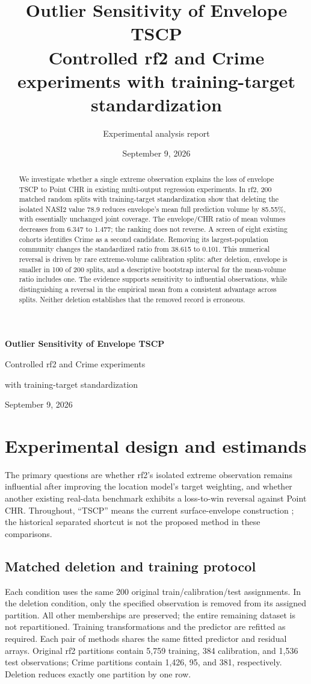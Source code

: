 \documentclass[11pt,letterpaper]{article}
\title{Outlier Sensitivity of Envelope TSCP\\[3pt]
\large Controlled rf2 and Crime experiments with training-target standardization}
\author{Experimental analysis report}
\date{September 9, 2026}
\begin{document}
\begin{center}
{\LARGE\bfseries Outlier Sensitivity of Envelope TSCP\par}
\vspace{0.4em}
{\large Controlled rf2 and Crime experiments\par}
{\large with training-target standardization\par}
\vspace{0.6em}
September 9, 2026
\end{center}
\begin{abstract}
We investigate whether a single extreme observation explains the loss of
envelope TSCP to Point CHR in existing multi-output regression experiments.
In rf2, 200 matched random splits with training-target standardization show
that deleting the isolated NASI2 value 78.9 reduces envelope's mean full
prediction volume by 85.55\%, with essentially unchanged joint coverage.
The envelope/CHR ratio of mean volumes decreases from 6.347 to 1.477;
the ranking does not reverse. A screen of eight existing cohorts identifies
Crime as a second candidate. Removing its largest-population community changes
the standardized ratio from 38.615 to 0.101. This numerical reversal is driven
by rare extreme-volume calibration splits: after deletion, envelope is smaller
in 100 of 200 splits, and a descriptive bootstrap interval for the mean-volume
ratio includes one. The evidence supports sensitivity to influential observations,
while distinguishing a reversal in the empirical mean from a consistent advantage
across splits. Neither deletion establishes that the removed record is erroneous.
\end{abstract}

\section{Experimental design and estimands}
The primary questions are whether rf2's isolated extreme observation remains
influential after improving the location model's target weighting, and whether
another existing real-data benchmark exhibits a loss-to-win reversal against
Point CHR. Throughout, ``TSCP'' means the current surface-envelope construction
\cite{methodnote}; the historical separated shortcut is not the proposed method
in these comparisons.

\subsection{Matched deletion and training protocol}
Each condition uses the same 200 original train/calibration/test assignments.
In the deletion condition, only the specified observation is removed from its
assigned partition. All other memberships are preserved; the entire remaining
dataset is not repartitioned. Training transformations and the predictor are
refitted as required. Each pair of methods shares the same fitted predictor
and residual arrays. Original rf2 partitions contain 5,759 training, 384
calibration, and 1,536 test observations; Crime partitions contain 1,426, 95,
and 381, respectively. Deletion reduces exactly one partition by one row.
\end{document}
